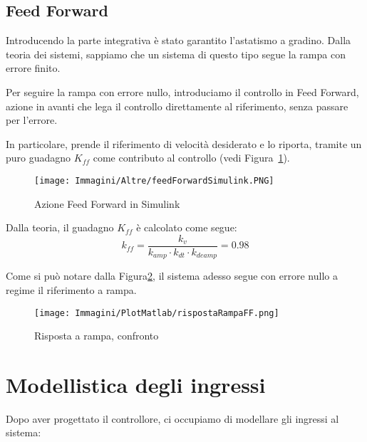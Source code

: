 \documentclass[a4paper,12pt]{article}
\begin{document}
\subsection{Feed Forward}

Introducendo la parte integrativa è stato garantito l'astatismo a gradino. Dalla teoria dei sistemi, sappiamo che un sistema di questo tipo segue la rampa con errore finito.

Per seguire la rampa con errore nullo, introduciamo il controllo in Feed Forward, azione in avanti che lega il controllo direttamente al riferimento, senza passare per l'errore.

In particolare, prende il riferimento di velocità desiderato e lo riporta, tramite un puro guadagno $K_{ff}$ come contributo al controllo (vedi Figura~\ref{fig: FFSimulink}). 

\vspace{0.5cm}

\begin{figure}[h!]
    \centering
    \texttt{[image: Immagini/Altre/feedForwardSimulink.PNG]}
    \caption{Azione Feed Forward in Simulink}
    \label{fig: FFSimulink}
\end{figure}

\vspace{0.5cm}

Dalla teoria, il guadagno $K_{ff}$ è calcolato come segue:
\[
    k_{ff} = \frac{k_v}{k_{amp} \cdot k_{dt} \cdot k_{deamp}}=0.98
\]

\vspace{0.5cm}

Come si può notare dalla Figura\ref{fig: rispostaArampa}, il sistema adesso segue con errore nullo a regime il riferimento a rampa.

\vspace{0.5cm}
\begin{figure}[h!]
    \centering
    \texttt{[image: Immagini/PlotMatlab/rispostaRampaFF.png]}
    \caption{Risposta a rampa, confronto}
    \label{fig: rispostaArampa}
\end{figure}

\newpage


\section{Modellistica degli ingressi}

Dopo aver progettato il controllore, ci occupiamo di modellare gli ingressi al sistema:
\end{document}

